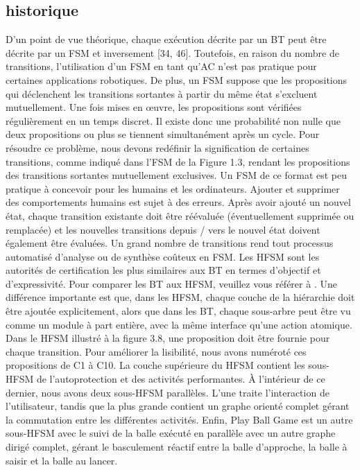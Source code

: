 \documentclass[titlepage]{article}
\begin{document}
		\subsection{historique}
			D'un point de vue théorique, chaque exécution décrite par un BT peut être décrite par un FSM et inversement [34, 46]. Toutefois, en raison du nombre de transitions, l'utilisation d'un FSM en tant qu'AC n'est pas pratique pour certaines applications robotiques. De plus, un FSM suppose que les propositions qui déclenchent les transitions sortantes à partir du même état s’excluent mutuellement. Une fois mises en œuvre, les propositions sont vérifiées régulièrement en un temps discret. Il existe donc une probabilité non nulle que deux propositions ou plus se tiennent simultanément après un cycle. Pour résoudre ce problème, nous devons redéfinir la signification de certaines transitions, comme indiqué dans l’FSM de la Figure 1.3, rendant les propositions des transitions sortantes mutuellement exclusives. Un FSM de ce format est peu pratique à concevoir pour les humains et les ordinateurs. Ajouter et supprimer des comportements humains est sujet à des erreurs. Après avoir ajouté un nouvel état, chaque transition existante doit être réévaluée (éventuellement supprimée ou remplacée) et les nouvelles transitions depuis / vers le nouvel état doivent également être évaluées. Un grand nombre de transitions rend tout processus automatisé d'analyse ou de synthèse coûteux en FSM.
			Les HFSM sont les autorités de certification les plus similaires aux BT en termes d'objectif et d'expressivité. Pour comparer les BT aux HFSM, veuillez vous référer à \cite{colledanchise_2017}. Une différence importante est que, dans les HFSM, chaque couche de la hiérarchie doit être ajoutée explicitement, alors que dans les BT, chaque sous-arbre peut être vu comme un module à part entière, avec la même interface qu'une action atomique.
			Dans le HFSM illustré à la figure 3.8, une proposition doit être fournie pour chaque transition. Pour améliorer la lisibilité, nous avons numéroté ces propositions de C1 à C10. La couche supérieure du HFSM contient les sous-HFSM de l'autoprotection et des activités performantes. À l'intérieur de ce dernier, nous avons deux sous-HFSM parallèles. L’une traite l’interaction de l’utilisateur, tandis que la plus grande contient un graphe orienté complet gérant la commutation entre les différentes activités. Enfin, Play Ball Game est un autre sous-HFSM avec le suivi de la balle exécuté en parallèle avec un autre graphe dirigé complet, gérant le basculement réactif entre la balle d’approche, la balle à saisir et la balle au lancer.
\end{document}
